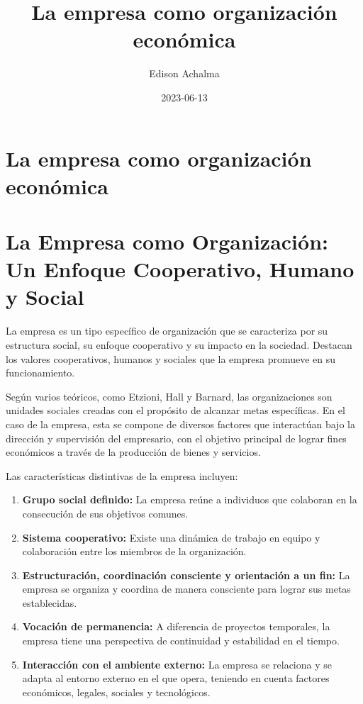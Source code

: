 \documentclass[
  man,
  floatsintext,
  longtable,
  a4paper,
  nolmodern,
  notxfonts,
  notimes,
  12pt,
  colorlinks=true,linkcolor=blue,citecolor=blue,urlcolor=blue]{apa7}
\title{La empresa como organización económica}
\author{Edison Achalma}
\affiliation{
{Escuela Profesional de Economía, Universidad Nacional de San Cristóbal
de Huamanga}}
\date{2023-06-13}
\begin{document}
\maketitle


\hypertarget{toc}{}
\tableofcontents
\newpage
\section[Introduction]{La empresa como organización económica}

\setcounter{secnumdepth}{3}

\setlength\LTleft{0pt}




\section{La Empresa como Organización: Un Enfoque Cooperativo, Humano y
Social}\label{la-empresa-como-organizaciuxf3n-un-enfoque-cooperativo-humano-y-social}

La empresa es un tipo específico de organización que se caracteriza por
su estructura social, su enfoque cooperativo y su impacto en la
sociedad. Destacan los valores cooperativos, humanos y sociales que la
empresa promueve en su funcionamiento.

Según varios teóricos, como Etzioni, Hall y Barnard, las organizaciones
son unidades sociales creadas con el propósito de alcanzar metas
específicas. En el caso de la empresa, esta se compone de diversos
factores que interactúan bajo la dirección y supervisión del empresario,
con el objetivo principal de lograr fines económicos a través de la
producción de bienes y servicios.

Las características distintivas de la empresa incluyen:

\begin{enumerate}
\def\labelenumi{\arabic{enumi}.}
\item
  \textbf{Grupo social definido:} La empresa reúne a individuos que
  colaboran en la consecución de sus objetivos comunes.
\item
  \textbf{Sistema cooperativo:} Existe una dinámica de trabajo en equipo
  y colaboración entre los miembros de la organización.
\item
  \textbf{Estructuración, coordinación consciente y orientación a un
  fin:} La empresa se organiza y coordina de manera consciente para
  lograr sus metas establecidas.
\item
  \textbf{Vocación de permanencia:} A diferencia de proyectos
  temporales, la empresa tiene una perspectiva de continuidad y
  estabilidad en el tiempo.
\item
  \textbf{Interacción con el ambiente externo:} La empresa se relaciona
  y se adapta al entorno externo en el que opera, teniendo en cuenta
  factores económicos, legales, sociales y tecnológicos.
\end{enumerate}
\end{document}
